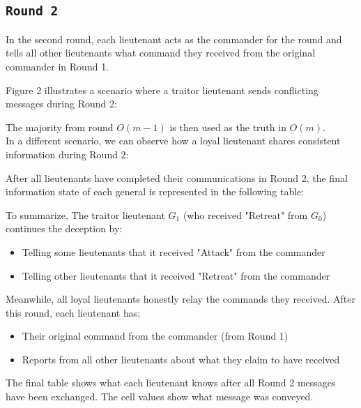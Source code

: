 \documentclass[11pt]{article}
\newcommand{\gen}[1]{\ensuremath{G_{#1}}}
\begin{document}
\subsection*{\texttt{\large Round 2}}
\justifying
In the second round, each lieutenant acts as the commander for the round and tells all other lieutenants what command they received from the original commander in Round 1.

Figure 2 illustrates a scenario where a traitor lieutenant sends conflicting messages during Round 2:

\begin{center}
    
\end{center}

\justifying
The majority from round $O(m-1)$ is then used as the truth in $O(m)$.\\

In a different scenario, we can observe how a loyal lieutenant shares consistent information during Round 2:



\justifying
After all lieutenants have completed their communications in Round 2, the final information state of each general is represented in the following table:

\begin{center}
    
\end{center}

\justifying
To summarize, The traitor lieutenant $\gen{1}$ (who received "Retreat" from $\gen{0}$) continues the deception by:
\begin{itemize}
    \item Telling some lieutenants that it received "Attack" from the commander
    \item Telling other lieutenants that it received "Retreat" from the commander
\end{itemize}

Meanwhile, all loyal lieutenants honestly relay the commands they received. After this round, each lieutenant has:
\begin{itemize}
    \item Their original command from the commander (from Round 1)
    \item Reports from all other lieutenants about what they claim to have received
\end{itemize}

The final table shows what each lieutenant knows after all Round 2 messages have been exchanged. The cell values show what message was conveyed.
\end{document}
